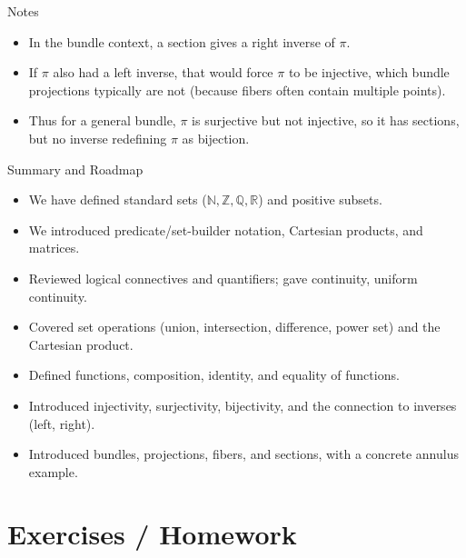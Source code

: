 \begin{frame}{Notes}
\begin{itemize}
    \item In the bundle context, a section gives a right inverse of \(\pi\).
    \item If \(\pi\) also had a left inverse, that would force \(\pi\) to be injective, which bundle projections typically are not (because fibers often contain multiple points).
    \item Thus for a general bundle, \(\pi\) is surjective but not injective, so it has sections, but no inverse redefining \(\pi\) as bijection.
\end{itemize}

\end{frame}

\begin{frame}{Summary and Roadmap}
\begin{itemize}
  \item We have defined standard sets (\(\mathbb{N},\mathbb{Z},\mathbb{Q},\mathbb{R}\)) and positive subsets.
  \item We introduced predicate/set-builder notation, Cartesian products, and matrices.
  \item Reviewed logical connectives and quantifiers; gave continuity, uniform continuity.
  \item Covered set operations (union, intersection, difference, power set) and the Cartesian product.
  \item Defined functions, composition, identity, and equality of functions.
  \item Introduced injectivity, surjectivity, bijectivity, and the connection to inverses (left, right).
  \item Introduced bundles, projections, fibers, and sections, with a concrete annulus example.
\end{itemize}

\end{frame}

\section{Exercises / Homework}

